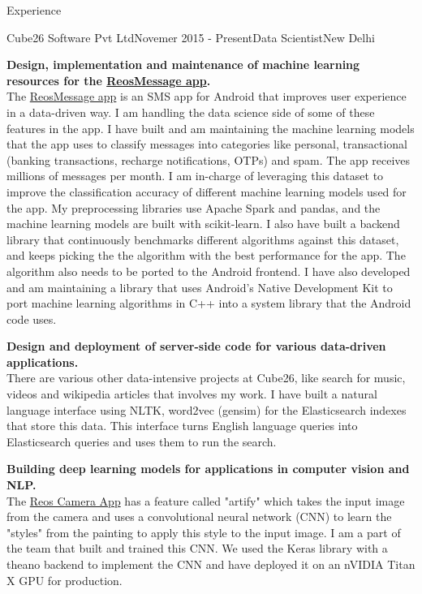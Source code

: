 \documentclass{resume} %
\begin{document}
\begin{rSection}{Experience}
\begin{rSubsection}{Cube26 Software Pvt Ltd}{Novemer 2015 - Present}{Data
    Scientist}{New Delhi}
\item {\bf Design, implementation and maintenance of machine learning resources for
    the \href{http://bit.ly/2bB0uGK}{ReosMessage app}.}\\
    The \href{http://bit.ly/2bB0uGK}{ReosMessage app} is an SMS app for Android
    that improves user experience in a data-driven way. I am handling the data
    science side of some of these features in the app. I have built and am
    maintaining the machine learning models that the app uses to classify
    messages into categories like personal, transactional (banking transactions,
    recharge notifications, OTPs) and spam. The app receives millions of
    messages per month. I am in-charge of leveraging this dataset to improve
    the classification accuracy of different machine learning models used for
    the app. My preprocessing libraries use Apache Spark and pandas, and the
    machine learning models are built with scikit-learn. I also have built
    a backend library that continuously benchmarks different algorithms against
    this dataset, and keeps picking the the algorithm with the best performance
    for the app. The algorithm also needs to be ported to the Android frontend.
    I have also developed and am maintaining a library that uses Android's
    Native Development Kit to port machine learning algorithms in C++ into a
    system library that the Android code uses.
\item {\bf Design and deployment of server-side code for various data-driven
    applications.}\\
    There are various other data-intensive projects at Cube26, like search for
    music, videos and wikipedia articles that involves my work. I have built a
    natural language interface using NLTK, word2vec (gensim) for the
    Elasticsearch indexes that store this data. This interface turns English
    language queries into Elasticsearch queries and uses them to run the
    search.
\item {\bf Building deep learning models for applications in computer vision and
    NLP.}\\
    The \href{http://bit.ly/2dlIoNg}{Reos Camera App} has a feature called
    "artify" which takes the input image from the camera and uses a
    convolutional neural network (CNN) to learn the "styles" from the painting
    to apply this style to the input image. I am a part of the team that built
    and trained this CNN. We used the Keras library with a theano backend to
    implement the CNN and have deployed it on an nVIDIA Titan X GPU for
    production.
\end{rSubsection}


\end{rSection}
\end{document}

